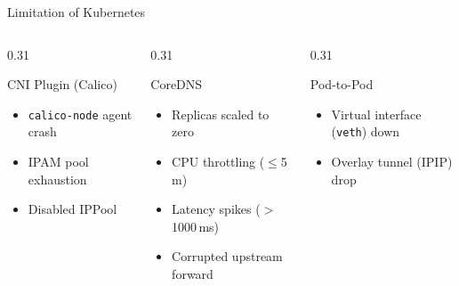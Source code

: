 \documentclass[aspectratio=169, 11pt]{beamer}
\begin{document}
\begin{frame}{Limitation of Kubernetes}

\begin{columns}[T]
\begin{column}{0.31\textwidth}
\begin{block}{CNI Plugin (Calico)}
\footnotesize
\begin{itemize}
  \item \texttt{calico-node} agent crash
  \item IPAM pool exhaustion
  \item Disabled IPPool
\end{itemize}
\end{block}
\end{column}

\begin{column}{0.31\textwidth}
\begin{block}{CoreDNS}
\footnotesize
\begin{itemize}
  \item Replicas scaled to zero
  \item CPU throttling ($\leq$5\,m)
  \item Latency spikes (${>}$1000\,ms)
  \item Corrupted upstream forward
\end{itemize}
\end{block}
\end{column}

\begin{column}{0.31\textwidth}
\begin{block}{Pod-to-Pod}
\footnotesize
\begin{itemize}
  \item Virtual interface (\texttt{veth}) down
  \item Overlay tunnel (IPIP) drop
\end{itemize}
\end{block}
\end{column}
\end{columns}

\end{frame}
\end{document}
